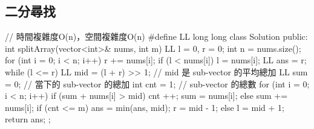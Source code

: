 \subsection{二分尋找}
\begin{Code}
// 時間複雜度O(n)，空間複雜度O(n)
#define LL long long
class Solution {
public:
    int splitArray(vector<int>& nums, int m) {
        LL l = 0, r = 0;
        int n = nums.size();
        for (int i = 0; i < n; i++) {
            r += nums[i];
            if (l < nums[i]) {
                l = nums[i];
            }
        }
        LL ans =  r;
        while (l <= r) {
            LL mid = (l + r) >> 1; // mid 是 sub-vector 的平均總加
            LL sum = 0; // 當下的 sub-vector 的總加
            int cnt = 1; // sub-vector 的總數
            for (int i = 0; i < n; i++) {
                if (sum + nums[i] > mid) {
                    cnt ++;
                    sum = nums[i];
                } else {
                    sum += nums[i];
                }
            }
            if (cnt <= m) {
                ans = min(ans, mid);
                r = mid - 1;
            } else {
                l = mid + 1;
            }
        }
        return ans;
    }
};
\end{Code}
